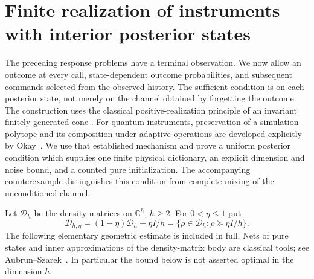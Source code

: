 \section{Finite realization of instruments with interior posterior states}
\label{sec:r74-instruments}

The preceding response problems have a terminal observation. We now allow
an outcome at every call, state-dependent outcome probabilities, and subsequent
commands selected from the observed history. The sufficient condition is on
each posterior state, not merely on the channel obtained by forgetting the
outcome. The construction uses the classical positive-realization principle
of an invariant finitely generated cone \cite{Heller65,MonrasWinter14}.
For quantum instruments, preservation of a simulation polytope and its
composition under adaptive operations are developed explicitly by
Okay~\cite{Okay26}. We use that established mechanism and prove a uniform
posterior condition which supplies one finite physical dictionary, an explicit
dimension and noise bound, and a counted pure initialization. The accompanying
counterexample distinguishes this condition from complete mixing of the
unconditioned channel.

Let $\mathcal D_h$ be the density matrices on $\mathbb C^h$, $h\ge2$.
For $0<\eta\le1$ put
\[
 \mathcal D_{h,\eta}
   =(1-\eta)\mathcal D_h+\eta I/h
   =\{\rho\in\mathcal D_h:\rho\succeq\eta I/h\}.
\]
The following elementary geometric estimate is included in full. Nets of
pure states and inner approximations of the density-matrix body are classical
tools; see Aubrun--Szarek~\cite{AubrunSzarek17}. In particular the bound below
is not asserted optimal in the dimension $h$.

